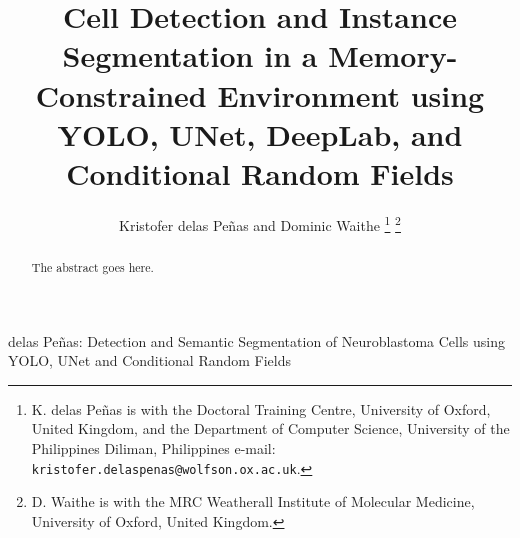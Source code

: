 \documentclass[journal]{IEEEtran}
\begin{document}
%
\title{Cell Detection and Instance Segmentation in a Memory-Constrained Environment using YOLO, UNet, DeepLab, and Conditional Random Fields}

\author{Kristofer delas Pe\~nas and
        Dominic Waithe%
\thanks{K. delas Pe\~nas is with the Doctoral Training Centre, University of Oxford, United Kingdom, and the Department of Computer Science, University of the Philippines Diliman, Philippines e-mail: \texttt{kristofer.delaspenas@wolfson.ox.ac.uk}.}%
\thanks{D. Waithe is with the MRC Weatherall Institute of Molecular Medicine, University of Oxford, United Kingdom.}}%

%
{delas Pe\~nas: Detection and Semantic Segmentation of Neuroblastoma Cells using YOLO, UNet and Conditional Random Fields}
% 











\maketitle

\begin{abstract}
The abstract goes here.
\end{abstract}
\end{document}
